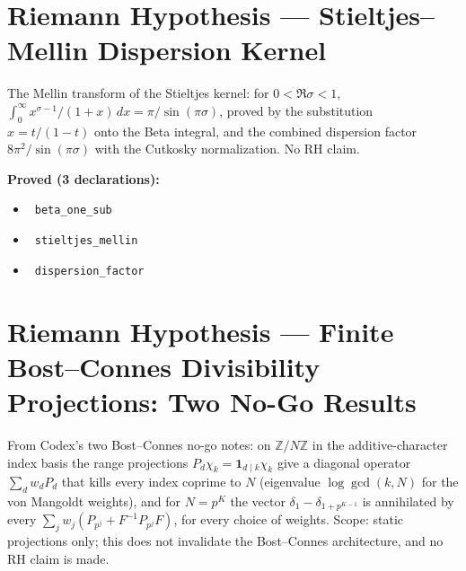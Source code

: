 \documentclass{report}
\theoremstyle{definition}
\begin{document}
\section{Riemann Hypothesis --- Stieltjes--Mellin Dispersion Kernel}
The Mellin transform of the Stieltjes kernel: for $0<\Re\sigma<1$, $\int_0^\infty x^{\sigma-1}/(1+x)\,dx=\pi/\sin(\pi\sigma)$, proved by the substitution $x=t/(1-t)$ onto the Beta integral, and the combined dispersion factor $8\pi^2/\sin(\pi\sigma)$ with the Cutkosky normalization. No RH claim.

\noindent\textbf{Proved (3 declarations):}
\begin{itemize}
  \item {}\leanok\ \texttt{beta\_one\_sub}
  \item {}\leanok\ \texttt{stieltjes\_mellin}
  \item {}\leanok\ \texttt{dispersion\_factor}
\end{itemize}

\section{Riemann Hypothesis --- Finite Bost--Connes Divisibility Projections: Two No-Go Results}
From Codex's two Bost--Connes no-go notes: on $\mathbb{Z}/N\mathbb{Z}$ in the additive-character index basis the range projections $P_d\chi_k=\mathbf 1_{d\mid k}\chi_k$ give a diagonal operator $\sum_d w_dP_d$ that kills every index coprime to $N$ (eigenvalue $\log\gcd(k,N)$ for the von Mangoldt weights), and for $N=p^K$ the vector $\delta_1-\delta_{1+p^{K-1}}$ is annihilated by every $\sum_j w_j(P_{p^j}+F^{-1}P_{p^j}F)$, for every choice of weights. Scope: static projections only; this does not invalidate the Bost--Connes architecture, and no RH claim is made.
\end{document}
